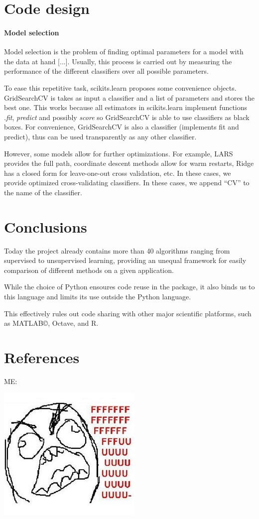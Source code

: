 \documentclass[twoside,11pt]{article}
\begin{document}
\section{Code design}


\paragraph {Model selection}

Model selection is the problem of finding optimal parameters for a
model with the data at hand [...]. Usually, this process is carried
out by measuring the performance of the different classifiers over all
possible parameters.

To ease this repetitive task, scikits.learn proposes some convenience
objects. GridSearchCV is takes as input a classifier and a list of
parameters and stores the best one. This works because all estimators
in scikits.learn implement functions .\emph{fit}, \emph{predict} and
possibly \emph{score} so GridSearchCV is able to use classifiers as
black boxes. For convenience, GridSearchCV is also a classifier
(implements fit and predict), thus can be used transparently as any
other classifier.

However, some models allow for further optimizations. For example,
LARS provides the full path, coordinate descent methods allow for warm
restarts, Ridge has a closed form for leave-one-out cross validation,
etc. In these cases, we provide optimized cross-validating
classifiers. In these cases, we append ``CV'' to the name of the
classifier.



\section{Conclusions}

Today the project already contains more than 40 algorithms ranging
from supervised to unsupervised learning, providing an unequal
framework for easily comparison of different methods on a given
application.

While the choice of Python ensoures code reuse in the package, it also
binds us to this language and limits its use outside the Python
language.

This effectively rules out code sharing with other major scientific
platforms, such as MATLAB©, Octave, and R.



\section{References}

ME:

\includegraphics{images/parafaber.jpg}
\end{document}
